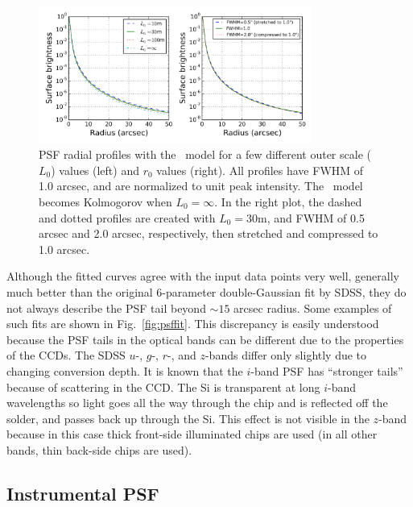 \begin{figure}[ht]
\centering
\includegraphics[width=0.8\textwidth]{FIGURES/vonK.png}
\vskip -0.2in 
\caption{PSF radial profiles with the \vk~model for a few different
  outer scale ($L_0$) values (left) and $r_0$ values (right). 
All profiles have FWHM of 1.0 arcsec, and
  are normalized to unit peak intensity. The \vk~model becomes
  Kolmogorov when $L_0 = \infty$.
In the right plot, the dashed and dotted profiles are created with
$L_0 = 30$m, and 
FWHM of 0.5 arcsec and 2.0 arcsec, respectively, then stretched and compressed to 1.0 arcsec.
\label{fig:vonK}}
\end{figure}


Although the fitted
curves agree with the input data points very well, generally much better than the
original 6-parameter double-Gaussian fit by SDSS, they do not always describe
the PSF tail beyond $\sim 15$ arcsec radius. 
Some examples of such fits are shown in Fig.~\ref{fig:psffit}.
This discrepancy is easily understood
because the PSF tails in the optical bands can be 
different due to the properties of the CCDs.
The SDSS $u$-, $g$-, $r$-, and $z$-bands differ only slightly due to
changing conversion depth. It is known that the $i$-band PSF has ``stronger tails''
because of scattering in the CCD.  The Si is transparent at long $i$-band wavelengths 
so light goes all the way through the chip and is reflected off the solder, and passes 
back up through the Si. This effect is not visible in the $z$-band because in this case
thick front-side illuminated chips are used (in all other bands, thin back-side chips are used). 



\subsection{Instrumental PSF \label{sec:instrPSF}} 

